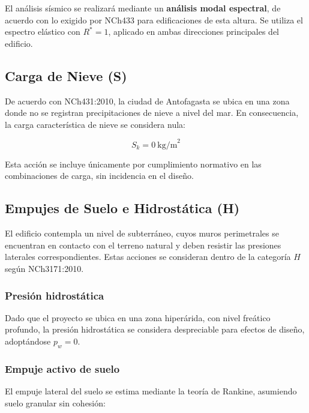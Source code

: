 El análisis sísmico se realizará mediante un \textbf{análisis modal espectral}, de acuerdo con lo exigido por NCh433 para edificaciones de esta altura. Se utiliza el espectro elástico con $R^* = 1$, aplicado en ambas direcciones principales del edificio.

\subsection{Carga de Nieve (S)}

De acuerdo con NCh431:2010, la ciudad de Antofagasta se ubica en una zona donde no se registran precipitaciones de nieve a nivel del mar. En consecuencia, la carga característica de nieve se considera nula:

\[
    S_k = 0\ \text{kg/m}^2
\]

Esta acción se incluye únicamente por cumplimiento normativo en las combinaciones de carga, sin incidencia en el diseño.

\subsection{Empujes de Suelo e Hidrostática (H)}

El edificio contempla un nivel de subterráneo, cuyos muros perimetrales se encuentran en contacto con el terreno natural y deben resistir las presiones laterales correspondientes. Estas acciones se consideran dentro de la categoría $H$ según NCh3171:2010.

\subsubsection*{Presión hidrostática}

Dado que el proyecto se ubica en una zona hiperárida, con nivel freático profundo, la presión hidrostática se considera despreciable para efectos de diseño, adoptándose $p_w = 0$.

\subsubsection*{Empuje activo de suelo}

El empuje lateral del suelo se estima mediante la teoría de Rankine, asumiendo suelo granular sin cohesión:

